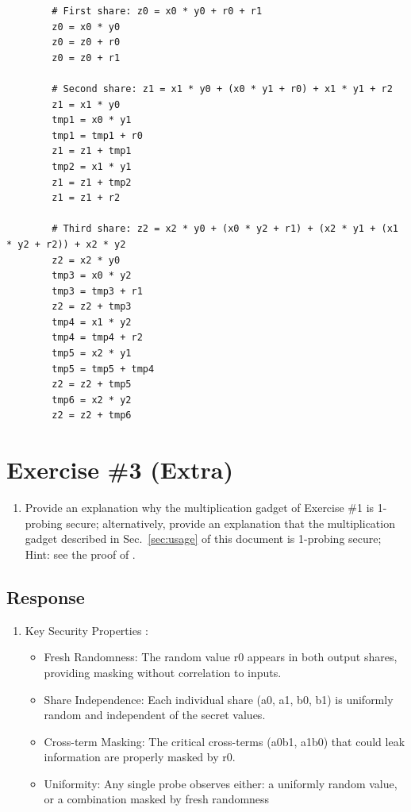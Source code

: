 \documentclass{article}
\begin{document}
\begin{enumerate}
\begin{itemize}
\begin{verbatim}
        # First share: z0 = x0 * y0 + r0 + r1
        z0 = x0 * y0
        z0 = z0 + r0
        z0 = z0 + r1
        
        # Second share: z1 = x1 * y0 + (x0 * y1 + r0) + x1 * y1 + r2
        z1 = x1 * y0
        tmp1 = x0 * y1
        tmp1 = tmp1 + r0
        z1 = z1 + tmp1
        tmp2 = x1 * y1
        z1 = z1 + tmp2
        z1 = z1 + r2
        
        # Third share: z2 = x2 * y0 + (x0 * y2 + r1) + (x2 * y1 + (x1 * y2 + r2)) + x2 * y2
        z2 = x2 * y0
        tmp3 = x0 * y2
        tmp3 = tmp3 + r1
        z2 = z2 + tmp3
        tmp4 = x1 * y2
        tmp4 = tmp4 + r2
        tmp5 = x2 * y1
        tmp5 = tmp5 + tmp4
        z2 = z2 + tmp5
        tmp6 = x2 * y2
        z2 = z2 + tmp6
      \end{verbatim}
  \end{itemize}
\end{enumerate}



\section*{Exercise \#3 (Extra)}
\begin{enumerate}
  \item Provide an explanation why the multiplication gadget of Exercise \#1 is 1-probing secure; alternatively, provide an explanation that
the multiplication gadget described in Sec.~\ref{sec:usage} of this document is 1-probing secure; Hint: see the proof of \cite[Th.
1]{DBLP:conf/crypto/IshaiSW03}.
\end{enumerate}

\subsection*{Response}
\begin{enumerate}
  \item Key Security Properties :
    \begin{itemize}
      \item Fresh Randomness: The random value r0 appears in both output shares, providing masking without correlation to inputs.
      \item Share Independence: Each individual share (a0, a1, b0, b1) is uniformly random and independent of the secret values.
      \item Cross-term Masking: The critical cross-terms (a0b1, a1b0) that could leak information are properly masked by r0.
      \item Uniformity: Any single probe observes either: a uniformly random value, or a combination masked by fresh randomness
    \end{itemize}
\end{enumerate}

\printbibliography
\end{document}
